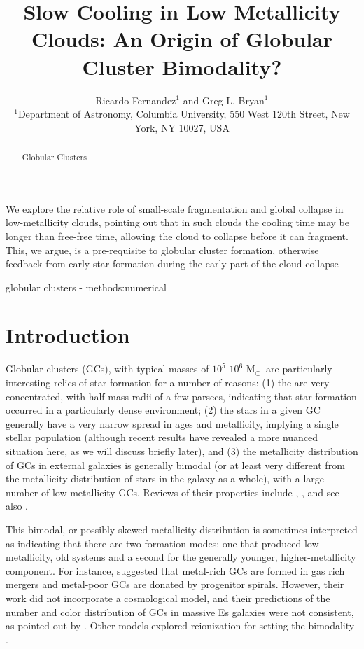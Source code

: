 \documentclass[useAMS,usenatbib]{mn2e}
\title{Slow Cooling in Low Metallicity Clouds: An Origin of Globular Cluster Bimodality?}
\author[R. Fernandez et al.]{Ricardo Fernandez$^{1}$ and Greg L. Bryan$^{1}$\\
$^{1}$Department of Astronomy, Columbia University, 550 West 120th Street, New York, NY 10027, USA}
\newcommand{\msun}{{M$_\odot$}}
\begin{document}
\date{}


\maketitle


\begin{abstract}
Globular Clusters
\end{abstract}

We explore the relative role of small-scale fragmentation and global collapse in low-metallicity clouds, pointing out that in such clouds the cooling time may be longer than free-free time, allowing the cloud to collapse before it can fragment.  This, we argue, is a pre-requisite to globular cluster formation, otherwise feedback from early star formation during the early part of the cloud collapse 

\begin{keywords}
globular clusters - methods:numerical
\end{keywords}

%
\section{Introduction}

Globular clusters (GCs), with typical masses of $10^5$-$10^6$ \msun\ are particularly interesting relics of star formation for a number of reasons: (1) the are very concentrated, with half-mass radii of a few parsecs, indicating that star formation occurred in a particularly dense environment; (2) the stars in a given GC generally have a very narrow spread in ages and metallicity, implying a single stellar population (although recent results have revealed a more nuanced situation here, as we will discuss briefly later), and (3) the metallicity distribution of GCs in external galaxies is generally bimodal (or at least very different from the metallicity distribution of stars in the galaxy as a whole), with a large number of low-metallicity GCs.  Reviews of their properties include \citet{Brodie2006}, \citet{Renzini2008, Renzini2013}, and see also \cite{zwart2010}.

This bimodal, or possibly skewed metallicity distribution \citep[e.g.,][]{Strader2003, Peng2006} is sometimes interpreted as indicating that there are two formation modes: one that produced low-metallicity, old systems and a second for the generally younger, higher-metallicity component.  For instance, \citet{Ashman1992} suggested that metal-rich GCs are formed in gas rich mergers and metal-poor GCs are donated by progenitor spirals.  However, their work did not incorporate a cosmological model, and their predictions of the number and color distribution of GCs in massive Es galaxies were not consistent, as pointed out by \citet{Forbes1997}.  Other models explored reionization for setting the bimodality \citep[e.g.,][]{Santos2003, Harris1994}.
\end{document}
